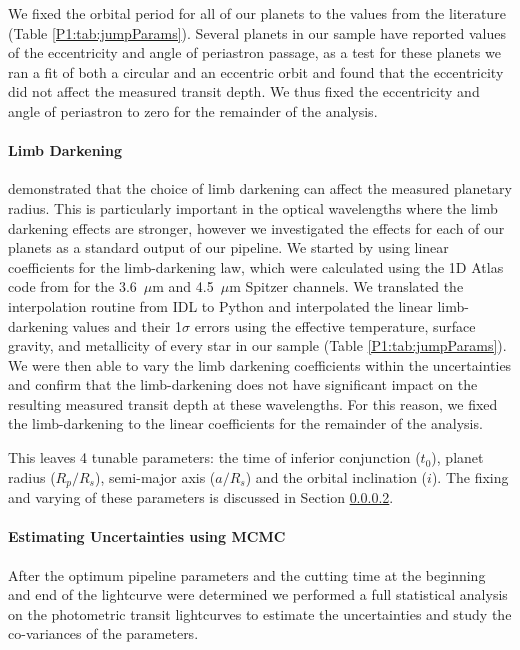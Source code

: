 We fixed the orbital period for all of our planets to the values from the literature (Table \ref{P1:tab:jumpParams}). Several planets in our sample have reported values of the eccentricity and angle of periastron passage, as a test for these planets we ran a fit of both a circular and an eccentric orbit and found that the eccentricity did not affect the measured transit depth. We thus fixed the eccentricity and angle of periastron to zero for the remainder of the analysis.

\paragraph{Limb Darkening}

\citet{Southworth2008} demonstrated that the choice of limb darkening can affect the measured planetary radius. This is particularly important in the optical wavelengths where the limb darkening effects are stronger, however we investigated the effects for each of our planets as a standard output of our pipeline.
We started by using linear coefficients for the limb-darkening law, which were calculated using the 1D Atlas code from \citet{Sing2010} for the 3.6~$\mu$m and 4.5~$\mu$m Spitzer channels. We translated the interpolation routine from IDL to Python and interpolated the linear limb-darkening values and their 1$\sigma$ errors using the effective temperature, surface gravity, and metallicity of every star in our sample (Table \ref{P1:tab:jumpParams}). We were then able to vary the limb darkening coefficients within the uncertainties and confirm that the limb-darkening does not have significant impact on the resulting measured transit depth at these wavelengths. For this reason, we fixed the limb-darkening to the linear coefficients for the remainder of the analysis.

This leaves 4 tunable parameters: the time of inferior conjunction ($t_0$), planet radius ($R_p/R_s$), semi-major axis ($a/R_s$) and the orbital inclination ($i$). The fixing and varying of these parameters is discussed in Section \ref{P1:subsec:fitting}.

\paragraph{Estimating Uncertainties using MCMC}
\label{P1:subsec:fitting}

After the optimum pipeline parameters and the cutting time at the beginning and end of the lightcurve were determined we performed a full statistical analysis on the photometric transit lightcurves to estimate the uncertainties and study the co-variances of the parameters.

